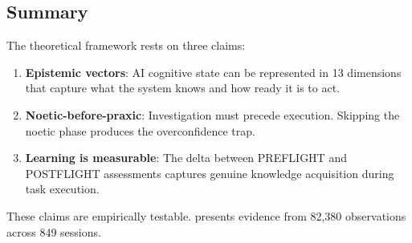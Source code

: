 \subsection{Summary}

The theoretical framework rests on three claims:

\begin{enumerate}
    \item \textbf{Epistemic vectors}: AI cognitive state can be represented in 13 dimensions that capture what the system knows and how ready it is to act.

    \item \textbf{Noetic-before-praxic}: Investigation must precede execution. Skipping the noetic phase produces the overconfidence trap.

    \item \textbf{Learning is measurable}: The delta between PREFLIGHT and POSTFLIGHT assessments captures genuine knowledge acquisition during task execution.
\end{enumerate}

These claims are empirically testable.  presents evidence from 82,380 observations across 849 sessions.
